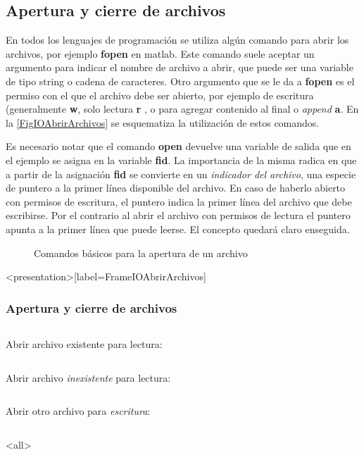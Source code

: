 \subsection{Apertura y cierre de archivos}
En todos los lenguajes de programación se utiliza algún comando
para abrir los archivos, por ejemplo \textbf{fopen} en matlab.
Este comando suele aceptar un argumento para indicar el
nombre de archivo a abrir, que puede ser una variable 
de tipo string o cadena de caracteres. Otro argumento
que se le da a \textbf{fopen} es el permiso con el 
que el archivo debe ser abierto, por ejemplo
de escritura (generalmente \textbf{w}, solo lectura \textbf{r}
, o para agregar contenido al final o \emph{append} \textbf{a}. 
En la  \autoref{FigIOAbrirArchivos} se esquematiza
la utilización de estos comandos. 

Es necesario notar que el comando \textbf{open} devuelve
una variable de salida que en el ejemplo se asigna 
en la variable \textbf{fid}. 
La importancia de la misma radica en que a partir
de la asignación \textbf{fid} se convierte en 
un \emph{indicador del archivo}, una especie de puntero
a la primer línea disponible del archivo. En caso
de haberlo abierto con permisos de escritura, 
el puntero indica la primer línea del 
archivo que debe escribirse. Por el contrario
al abrir el archivo con permisos de lectura
el puntero apunta a la primer
línea que puede leerse. El concepto quedará 
claro enseguida. 

\begin{figure}
\caption{Comandos básicos para la apertura de un archivo\label{FigIOAbrirArchivos}}
\end{figure}

\mode*

\begin{frame}<presentation>[label=FrameIOAbrirArchivos]
\frametitle{Apertura y cierre de archivos}

\begin{columns}[T]
\hfill Abrir archivo existente para lectura:
\begin{codeblock}

\end{codeblock}
\end{columns}

\begin{columns}[T]
\hfill Abrir archivo \emph{inexistente} para lectura:
\begin{codeblock}

\end{codeblock}
\end{columns}

\begin{columns}[T]
\hfill Abrir otro archivo  para \emph{escritura}:
\begin{codeblock}

\end{codeblock}
\end{columns}

\end{frame}

\mode<all>
